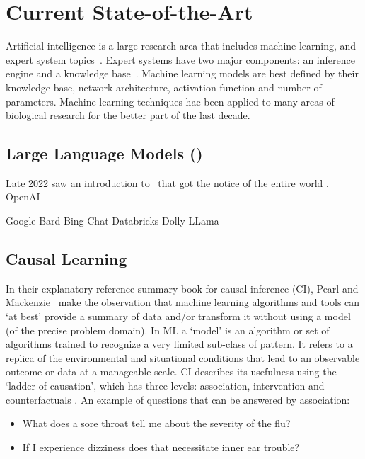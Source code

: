 \section{Current State-of-the-Art}

Artificial intelligence is a large research area that includes machine learning, and expert system topics~\cite{RussellNorvig:2016}.
Expert systems have two major components: an inference engine and a knowledge base~\cite{Liao:2005,Tan:2017}.
Machine learning models are best defined by their knowledge base, network architecture, activation function and number of parameters.
Machine learning techniques hae been applied to many areas of biological research \cite{Deng:2011,Angermueller:2016,Gawehn:2016_deep,Min:2017,Miotto:2018:deep,Tran:2018,Toh:2019,Zhang:2019,Bouwmeester:2020,Wen:2020:deep,Caudai:2021,Talukder:2021,Hassabis:2022} for the better part of the last decade.

\subsection{Large Language Models (\llms)}
Late 2022 saw an introduction to \llms\ that got the notice of the entire world \cite{Schulman:2022_chatgptintro}.
OpenAI

Google Bard
Bing Chat
Databricks Dolly
LLama

\subsection{Causal Learning}
In their explanatory reference summary book for causal inference (CI), Pearl and Mackenzie~\cite{Pearl:2018} make the observation that machine learning algorithms and tools can `at best' provide a summary of data and/or transform it without using a model (of the precise problem domain).
In ML a `model' is an algorithm or set of algorithms trained to recognize a very limited sub-class of pattern.
It refers to a replica of the environmental and situational conditions that lead to an observable outcome or data at a manageable scale.
CI describes its usefulness using the `ladder of causation', which has three levels: association, intervention and counterfactuals \cite{Pearl:2018}.
An example of questions that can be answered by association:
\begin{itemize}
    \item What does a sore throat tell me about the severity of the flu?
    \item If I experience dizziness does that necessitate inner ear trouble?
\end{itemize}


